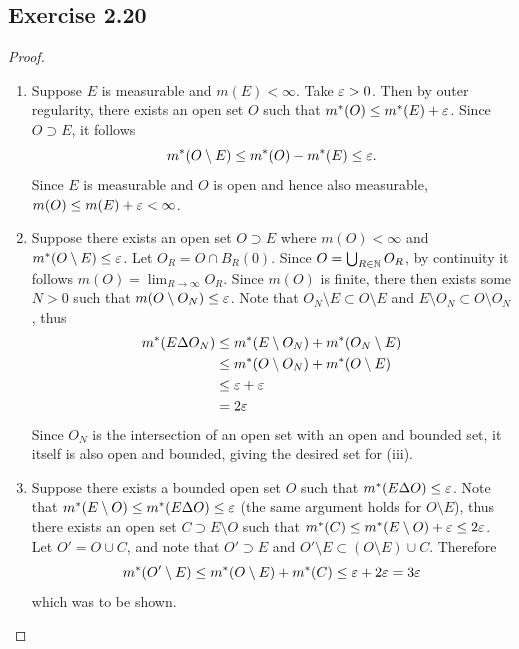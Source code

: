 \documentclass[hw_all.tex]{subfiles}
\begin{document}
\subsection{Exercise 2.20}

\begin{proof}
    \begin{enumerate}
        \item[i $\Rightarrow$ ii)]
            Suppose $E$ is measurable and $m(E) < \infty$. Take $\varepsilon > 0$. Then by outer regularity, there exists an open set $O$ such that $m^*(O) \leq m^*(E) + \varepsilon$. Since $O \supset E$, it follows
            \[
                m^*(O \setminus E) \leq m^*(O) - m^*(E) \leq \varepsilon
            .\]
            Since $E$ is measurable and $O$ is open and hence also measurable, $m(O) \leq m(E) + \varepsilon < \infty$.

        \item[ii $\Rightarrow$ iii)]
            Suppose there exists an open set $O \supset E$ where $m(O) < \infty$ and $m^*(O \setminus E) \leq \varepsilon$. Let $O_R = O \cap B_R(0)$. Since $O = \bigcup_{R \in \mathbb{N}} O_R$, by continuity it follows $m(O) = \lim_{R \to \infty} O_R$. Since $m(O)$ is finite, there then exists some $N > 0$ such that $m(O \setminus O_N) \leq \varepsilon$. Note that $O_N \setminus E \subset O \setminus E$ and $E \setminus O_N \subset O \setminus O_N$, thus
            \begin{align*}
                m^*(E \Delta O_N) &\leq m^*(E \setminus O_N) + m^*(O_N \setminus E) \\
                                 &\leq m^*(O \setminus O_N) + m^*(O \setminus E) \\
                                 &\leq \varepsilon + \varepsilon \\
                                 &=2\varepsilon
            \end{align*}
            Since $O_N$ is the intersection of an open set with an open and bounded set, it itself is also open and bounded, giving the desired set for (iii).

        \item[iii $\Rightarrow$ i)]
            Suppose there exists a bounded open set $O$ such that $m^*(E \Delta O) \leq \varepsilon$. Note that $m^*(E \setminus O) \leq m^*(E \Delta O) \leq \varepsilon$ (the same argument holds for $O \setminus E$), thus there exists an open set $C \supset E \setminus O$ such that $m^*(C) \leq m^*(E \setminus O) + \varepsilon \leq 2\varepsilon$. Let $O' = O \cup C$, and note that $O' \supset E$ and $O' \setminus E \subset (O \setminus E) \cup C$. Therefore
            \[
                m^*(O' \setminus E) \leq m^*(O \setminus E) + m^*(C) \leq \varepsilon + 2\varepsilon = 3 \varepsilon
            \]
            which was to be shown.


\end{enumerate}
\end{proof}
\end{document}
